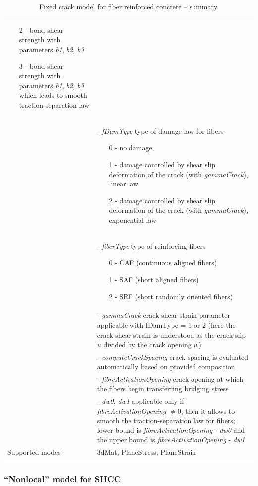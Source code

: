 \documentclass[a4paper]{article}
\newcommand{\param}[1]{{\it #1}}
\begin{document}
\begin{longtable}{|l|p{9cm}|}
\begin{itemize}
\item[2 -] bond shear strength with parameters \param{b1}, \param{b2}, \param{b3}
\item[3 -] bond shear strength with parameters \param{b1}, \param{b2}, \param{b3} which leads to smooth traction-separation law
\end{itemize}\\
&- \param{fDamType} type of damage law for fibers
\begin{itemize}\setlength{\itemsep}{-3pt}
\item[0 -] no damage
\item[1 -] damage controlled by shear slip deformation of the crack (with \param{gammaCrack}), linear law
\item[2 -] damage controlled by shear slip deformation of the crack (with \param{gammaCrack}), exponential law
\end{itemize}\\
&- \param{fiberType} type of reinforcing fibers
\begin{itemize}\setlength{\itemsep}{-3pt}
\item[0 -] CAF (continuous aligned fibers)
\item[1 -] SAF (short aligned fibers)
\item[2 -] SRF (short randomly oriented fibers)
\end{itemize}\\
&- \param{gammaCrack} crack shear strain parameter applicable with fDamType = 1 or 2 (here the crack shear strain is understood as the crack slip $u$ divided by the crack opening $w$)\\
&- \param{computeCrackSpacing} crack spacing is evaluated automatically based on provided composition\\
&- \param{fibreActivationOpening} crack opening at which the fibers begin transferring bridging stress\\
&- \param{dw0}, \param{dw1} applicable only if \param{fibreActivationOpening} $\neq 0$, then it allows to smooth the traction-separation law for fibers; lower bound is \param{fibreActivationOpening} - \param{dw0} and the upper bound is \param{fibreActivationOpening} - \param{dw1}\\
Supported modes& 3dMat, PlaneStress, PlaneStrain\\
\hline
\caption{Fixed crack model for fiber reinforced concrete -- summary.}
\label{frcfcm_table}
\end{longtable}


\subsubsection{``Nonlocal'' model for SHCC}
\end{document}
